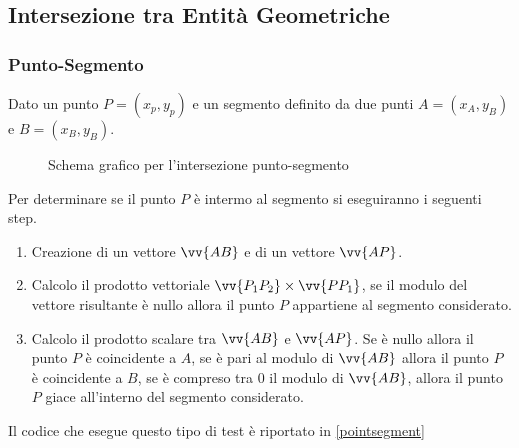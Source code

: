 \subsection{Intersezione tra Entità Geometriche}
%
\subsubsection{Punto-Segmento}
Dato un punto $P = (x_p, y_p)$ e un segmento definito da due punti $A = (x_A, y_B)$ e $B = (x_B, y_B)$.

\begin{figure}[h!]
	\centering
	\caption{Schema grafico per l'intersezione punto-segmento}
\end{figure}
\noindent
Per determinare se il punto $P$ è intermo al segmento si eseguiranno i seguenti step.
\begin{enumerate}
	\item Creazione di un vettore $\vv{AB}$ e di un vettore $\vv{AP}$.
	\item Calcolo il prodotto vettoriale  $\vv{P_1P_2} \times  \vv{PP_1}$, se il modulo del vettore risultante è nullo allora il punto $P$ appartiene al segmento considerato.
	\item Calcolo il prodotto scalare tra $\vv{AB}$ e $\vv{AP}$. Se è nullo allora il punto $P$ è coincidente a $A$, se è pari al modulo di $\vv{AB}$ allora il punto $P$ è coincidente a $B$, se è compreso tra 0 il modulo di $\vv{AB}$, allora il punto $P$ giace all'interno del segmento considerato.
\end{enumerate}
Il codice che esegue questo tipo di test è riportato in \figurename{ \ref{pointsegment}}

